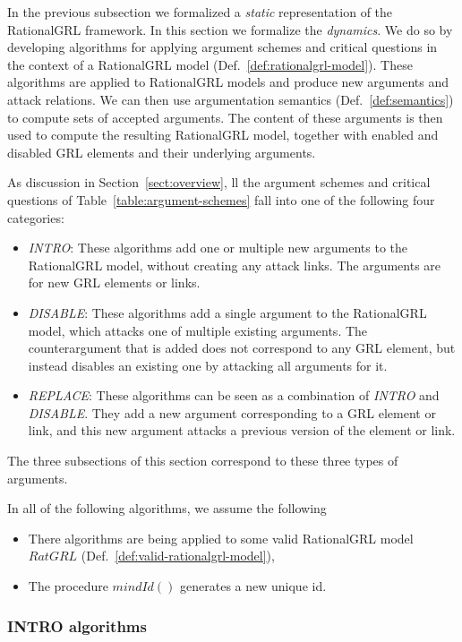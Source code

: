 In the previous subsection we formalized a \emph{static} representation of the RationalGRL framework. In this section we formalize the \emph{dynamics}. We do so by developing algorithms for applying argument schemes and critical questions in the context of a RationalGRL model (Def.~\ref{def:rationalgrl-model}). These algorithms are applied to RationalGRL models and produce new arguments and attack relations. We can then use argumentation semantics (Def.~\ref{def:semantics}) to compute sets of accepted arguments. The content of these arguments is then used to compute the resulting RationalGRL model, together with enabled and disabled GRL elements and their underlying arguments.

As discussion in Section~\ref{sect:overview}, ll the argument schemes and critical questions of Table~\ref{table:argument-schemes} fall into one of the following four categories:
\begin{itemize}
\item \emph{INTRO}: These algorithms add one or multiple new arguments to the RationalGRL model, without creating any attack links. The arguments are for new GRL elements or links.
\item \emph{DISABLE}: These algorithms add a single argument to the RationalGRL model, which attacks one of multiple existing arguments. The counterargument that is added does not correspond to any GRL element, but instead disables an existing one by attacking all arguments for it.
\item \emph{REPLACE}: These algorithms can be seen as a combination of \emph{INTRO} and \emph{DISABLE}. They add a new argument corresponding to a GRL element or link, and this new argument attacks a previous version of the element or link. 
\end{itemize}

The three subsections of this section correspond to these three types of arguments.

In all of the following algorithms, we assume the following
\begin{itemize}
\item There algorithms are being applied to some valid RationalGRL model $RatGRL$ (Def.~\ref{def:valid-rationalgrl-model}),
\item The procedure $mindId()$ generates a new unique id.
\end{itemize}

\subsubsection{INTRO algorithms}


